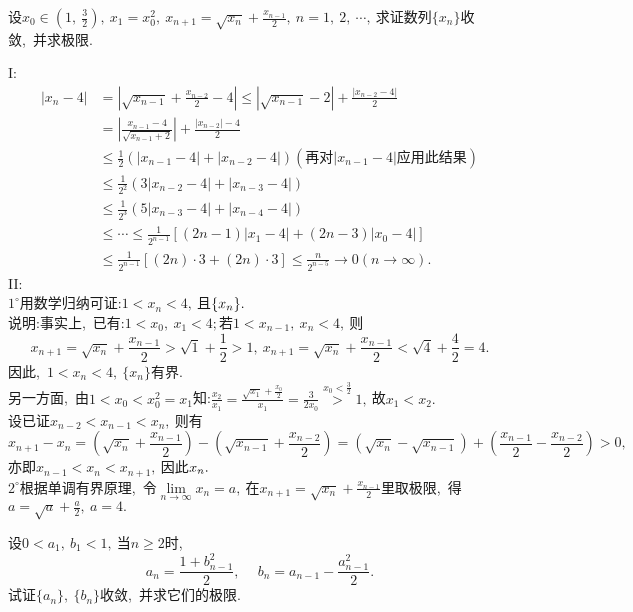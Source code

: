 \newpage
\begin{problem}
	设$x_0\in\left(1,\ \frac{3}{2}\right),\ x_1=x_0^2,\ x_{n+1}=\sqrt{x_n}+\frac{x_{n-1}}{2},\ n=1,\ 2,\ \cdots,\ $求证数列$\{x_n\}$收敛,\ 并求极限.
\end{problem}
\begin{solution}
	I:$$\begin{aligned}
		|x_n-4|&=\left|\sqrt{x_{n-1}}+\frac{x_{n-2}}{2}-4\right|\leqslant|\sqrt{x_{n-1}}-2|+\frac{|x_{n-2}-4|}{2}\\
		&=\left|\frac{x_{n-1}-4}{\sqrt{x_{n-1}+2}}\right|+\frac{|x_{n-2}|-4}{2}\\
		&\leqslant\frac{1}{2}(|x_{n-1}-4|+|x_{n-2}-4|)(\text{再对}|x_{n-1}-4|\text{应用此结果})\\
		&\leqslant\frac{1}{2^2}(3|x_{n-2}-4|+|x_{n-3}-4|)\\
		&\leqslant\frac{1}{2^3}(5|x_{n-3}-4|+|x_{n-4}-4|)\\
		&\leqslant\cdots\leqslant\frac{1}{2^{n-1}}[(2n-1)|x_1-4|+(2n-3)|x_0-4|]\\
		&\leqslant\frac{1}{2^{n-1}}[(2n)\cdot 3+(2n)\cdot 3]\leqslant\frac{n}{2^{n-5}}\rightarrow 0(n\rightarrow\infty).
	\end{aligned}$$
	II:\\
	$1^\circ$用数学归纳可证:$1<x_n<4,\ $且$\{x_n\}\narrower.$\\
	说明:事实上,\ 已有:$1<x_0,\ x_1<4;$若$1<x_{n-1},\ x_n<4,\ $则
	$$x_{n+1}=\sqrt{x_n}+\frac{x_{n-1}}{2}>\sqrt{1}+\frac{1}{2}>1,\ x_{n+1}=\sqrt{x_n}+\frac{x_{n-1}}{2}<\sqrt{4}+\frac{4}{2}=4.$$
	因此,\ $1<x_n<4,\ \{x_n\}$有界.\\
	另一方面,\ 由$1<x_0<x_0^2=x_1$知:$\frac{x_2}{x_1}=\frac{\sqrt{x_1}+\frac{x_0}{2}}{x_1}=\frac{3}{2x_0}\stackrel{x_0<\frac{3}{2}}{>}1,\ $故$x_1<x_2.$\\
	设已证$x_{n-2}<x_{n-1}<x_n,\ $则有
	$$x_{n+1}-x_n=\left(\sqrt{x_n}+\frac{x_{n-1}}{2}\right)-\left(\sqrt{x_{n-1}}+\frac{x_{n-2}}{2}\right)=(\sqrt{x_n}-\sqrt{x_{n-1}})+\left(\frac{x_{n-1}}{2}-\frac{x_{n-2}}{2}\right)>0,\ $$
	亦即$x_{n-1}<x_n<x_{n+1},\ $因此$x_n\narrower.$\\
	$2^\circ$根据单调有界原理,\ 令$\lim\limits_{n\rightarrow\infty}x_n=a,\ $在$x_{n+1}=\sqrt{x_n}+\frac{x_{n-1}}{2}$里取极限,\ 得$a=\sqrt{a}+\frac{a}{2},\ a=4.$
\end{solution}
\newpage
\begin{problem}
	设$0<a_1,\ b_1<1,\ $当$n\geqslant 2$时,\ 
	\begin{equation}
		a_n=\frac{1+b_{n-1}^2}{2},\ \quad b_n=a_{n-1}-\frac{a_{n-1}^2}{2}.\label{1.4.19}
	\end{equation}
	试证$\{a_n\},\ \{b_n\}$收敛,\ 并求它们的极限.
\end{problem}
